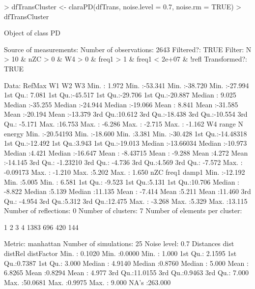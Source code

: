 \documentclass{article}
\renewenvironment{Schunk}{\begin{center}
    \scriptsize
    \begin{boxedminipage}{0.95\textwidth}}{
    \end{boxedminipage}\end{center}}
\begin{document}
\begin{Schunk}
\begin{Sinput}
> dfTransCluster <- claraPD(dfTrans, noise.level = 0.7, noise.rm = TRUE)
> dfTransCluster
\end{Sinput}
\begin{Soutput}
Object of class  PD 

Source of measurements:  
Number of observations:  2643 
Filtered?:  TRUE 
Filter: N > 10 & nZC > 0 & W4 > 0 & freq1 > 1 & freq1 < 2e+07 & !refl
Transformed?: TRUE 

Data:
     RefMax             W1                W2                W3         
 Min.   : 1.972   Min.   :-53.341   Min.   :-38.720   Min.   :-27.994  
 1st Qu.: 7.081   1st Qu.:-45.517   1st Qu.:-29.706   1st Qu.:-20.887  
 Median : 9.025   Median :-35.255   Median :-24.944   Median :-19.066  
 Mean   : 8.841   Mean   :-31.585   Mean   :-20.194   Mean   :-13.379  
 3rd Qu.:10.612   3rd Qu.:-18.438   3rd Qu.:-10.554   3rd Qu.: -5.171  
 Max.   :16.753   Max.   : -6.286   Max.   : -2.715   Max.   : -1.162  
       W4                range               N             energy       
 Min.   :-20.54193   Min.   :-18.600   Min.   :3.381   Min.   :-30.428  
 1st Qu.:-14.48318   1st Qu.:-12.492   1st Qu.:3.943   1st Qu.:-19.013  
 Median :-13.66034   Median :-10.973   Median :4.421   Median :-16.647  
 Mean   : -8.43715   Mean   : -9.288   Mean   :4.272   Mean   :-14.145  
 3rd Qu.: -1.23210   3rd Qu.: -4.736   3rd Qu.:4.569   3rd Qu.: -7.572  
 Max.   : -0.09173   Max.   : -1.210   Max.   :5.202   Max.   :  1.650  
      nZC              freq1           damp1       
 Min.   :-12.192   Min.   :5.005   Min.   : 6.581  
 1st Qu.: -9.523   1st Qu.:5.131   1st Qu.:10.706  
 Median : -8.822   Median :5.139   Median :11.135  
 Mean   : -7.414   Mean   :5.211   Mean   :11.460  
 3rd Qu.: -4.954   3rd Qu.:5.312   3rd Qu.:12.475  
 Max.   : -3.268   Max.   :5.329   Max.   :13.115  
Number of reflections:  0 
Number of clusters:  7 
Number of elements per cluster:

   1    2    3    4 
1383  696  420  144 

Metric:  manhattan 
Number of simulations:  25 
Noise level:  0.7 
Distances 
      dist            distRel         distFactor     
 Min.   : 0.1020   Min.   :0.0000   Min.   :  1.000  
 1st Qu.: 2.1595   1st Qu.:0.7387   1st Qu.:  3.000  
 Median : 4.9140   Median :0.8760   Median :  5.000  
 Mean   : 6.8265   Mean   :0.8294   Mean   :  4.977  
 3rd Qu.:11.0155   3rd Qu.:0.9463   3rd Qu.:  7.000  
 Max.   :50.0681   Max.   :0.9975   Max.   :  9.000  
                                    NA's   :263.000  
\end{Soutput}
\end{Schunk}
\end{document}
